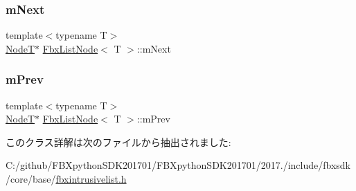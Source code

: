 \mbox{\label{class_fbx_list_node_ab2222766332e5adf83e11f3837258193}} 
\subsubsection{\texorpdfstring{m\+Next}{mNext}}
{\footnotesize\ttfamily template$<$typename T$>$ \\
\hyperlink{class_fbx_list_node}{NodeT}$\ast$ \hyperlink{class_fbx_list_node}{Fbx\+List\+Node}$<$ T $>$\+::m\+Next}

\mbox{\label{class_fbx_list_node_ac384122a2dbb52a949646b26db8b59fc}} 
\subsubsection{\texorpdfstring{m\+Prev}{mPrev}}
{\footnotesize\ttfamily template$<$typename T$>$ \\
\hyperlink{class_fbx_list_node}{NodeT}$\ast$ \hyperlink{class_fbx_list_node}{Fbx\+List\+Node}$<$ T $>$\+::m\+Prev}



このクラス詳解は次のファイルから抽出されました\+:\begin{DoxyCompactItemize}
\item 
C\+:/github/\+F\+B\+Xpython\+S\+D\+K201701/\+F\+B\+Xpython\+S\+D\+K201701/2017./include/fbxsdk/core/base/\hyperlink{fbxintrusivelist_8h}{fbxintrusivelist.\+h}\end{DoxyCompactItemize}
